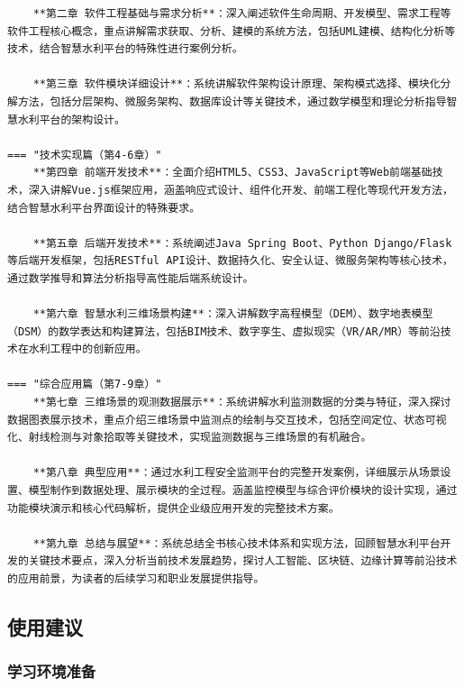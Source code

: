 \begin{verbatim}
    **第二章 软件工程基础与需求分析**：深入阐述软件生命周期、开发模型、需求工程等软件工程核心概念，重点讲解需求获取、分析、建模的系统方法，包括UML建模、结构化分析等技术，结合智慧水利平台的特殊性进行案例分析。
    
    **第三章 软件模块详细设计**：系统讲解软件架构设计原理、架构模式选择、模块化分解方法，包括分层架构、微服务架构、数据库设计等关键技术，通过数学模型和理论分析指导智慧水利平台的架构设计。

=== "技术实现篇（第4-6章）"
    **第四章 前端开发技术**：全面介绍HTML5、CSS3、JavaScript等Web前端基础技术，深入讲解Vue.js框架应用，涵盖响应式设计、组件化开发、前端工程化等现代开发方法，结合智慧水利平台界面设计的特殊要求。
    
    **第五章 后端开发技术**：系统阐述Java Spring Boot、Python Django/Flask等后端开发框架，包括RESTful API设计、数据持久化、安全认证、微服务架构等核心技术，通过数学推导和算法分析指导高性能后端系统设计。
    
    **第六章 智慧水利三维场景构建**：深入讲解数字高程模型（DEM）、数字地表模型（DSM）的数学表达和构建算法，包括BIM技术、数字孪生、虚拟现实（VR/AR/MR）等前沿技术在水利工程中的创新应用。

=== "综合应用篇（第7-9章）"
    **第七章 三维场景的观测数据展示**：系统讲解水利监测数据的分类与特征，深入探讨数据图表展示技术，重点介绍三维场景中监测点的绘制与交互技术，包括空间定位、状态可视化、射线检测与对象拾取等关键技术，实现监测数据与三维场景的有机融合。
    
    **第八章 典型应用**：通过水利工程安全监测平台的完整开发案例，详细展示从场景设置、模型制作到数据处理、展示模块的全过程。涵盖监控模型与综合评价模块的设计实现，通过功能模块演示和核心代码解析，提供企业级应用开发的完整技术方案。
    
    **第九章 总结与展望**：系统总结全书核心技术体系和实现方法，回顾智慧水利平台开发的关键技术要点，深入分析当前技术发展趋势，探讨人工智能、区块链、边缘计算等前沿技术的应用前景，为读者的后续学习和职业发展提供指导。
\end{verbatim}

\subsection{使用建议}\label{ux4f7fux7528ux5efaux8bae}

\subsubsection{学习环境准备}\label{ux5b66ux4e60ux73afux5883ux51c6ux5907}


